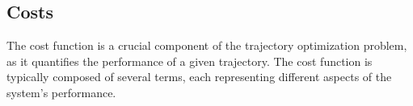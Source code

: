 \documentclass[main.tex]{subfiles}
\begin{document}
\begin{comment}
This formulation enables explicit enforcement of physical constraints such as contact complementarity by treating velocities as control variables. For instance, assigning a high cost to velocities at inactive contacts discourages motion in those regions, effectively ensuring that contacts are only active when physically meaningful.

The update to the timestamp is given by:
\begin{equation}
    t_{k+1} = t_k + \tau_k
\end{equation}

The state update for each end-effector’s position and orientation is governed by the basic kinematic relations:
\begin{equation}
    \mathbf{p}_{l,k+1} = \mathbf{p}_{l,k} + \mathbf{v}_{l,k} \tau_k
\end{equation}
\begin{equation}
    \mathbf{q}_{l,k+1} = \mathcal{Q}(\boldsymbol{\omega}_{l,k}, \tau_k) \cdot \mathbf{q}_{l,k}
\end{equation}

Here, $\mathcal{Q}(\boldsymbol{\omega}_{l,k}, \tau_k)$ represents the quaternion corresponding to the angular displacement over the time interval $\tau_k$, computed from the angular velocity $\boldsymbol{\omega}_{l,k}$.

Integrating all these elements, the complete system dynamics are compactly expressed as a state transition function:
\begin{equation}
    x_{k+1} = f(x_k, u_k)
\end{equation}

This function encapsulates both the kinematics and dynamics of the system, allowing for predictive simulation or optimization over multiple time steps.
\end{comment}
\subsection{Costs}
The cost function is a crucial component of the trajectory optimization problem, as it quantifies the performance of a given trajectory. The cost function is typically composed of several terms, each representing different aspects of the system's performance.
\end{document}
